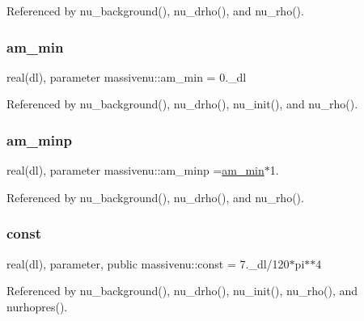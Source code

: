 Referenced by nu\+\_\+background(), nu\+\_\+drho(), and nu\+\_\+rho().

\mbox{\label{namespacemassivenu_a78f8e34c3e80b51195c21fdaa07761b1}} 
\subsubsection{\texorpdfstring{am\+\_\+min}{am\_min}}
{\footnotesize\ttfamily real(dl), parameter massivenu\+::am\+\_\+min = 0.\+\_\+dl\hspace{0.3cm}{\ttfamily [private]}}



Referenced by nu\+\_\+background(), nu\+\_\+drho(), nu\+\_\+init(), and nu\+\_\+rho().

\mbox{\label{namespacemassivenu_a3d0cea67f62f7fd30ce0c991b6215a9b}} 
\subsubsection{\texorpdfstring{am\+\_\+minp}{am\_minp}}
{\footnotesize\ttfamily real(dl), parameter massivenu\+::am\+\_\+minp =\mbox{\hyperlink{namespacemassivenu_a78f8e34c3e80b51195c21fdaa07761b1}{am\+\_\+min}}$\ast$1.\hspace{0.3cm}{\ttfamily [private]}}



Referenced by nu\+\_\+background(), nu\+\_\+drho(), and nu\+\_\+rho().

\mbox{\label{namespacemassivenu_a70abc43ce18c77a19a2a5a3577cdca33}} 
\subsubsection{\texorpdfstring{const}{const}}
{\footnotesize\ttfamily real(dl), parameter, public massivenu\+::const = 7.\+\_\+dl/120$\ast$pi$\ast$$\ast$4}



Referenced by nu\+\_\+background(), nu\+\_\+drho(), nu\+\_\+init(), nu\+\_\+rho(), and nurhopres().

